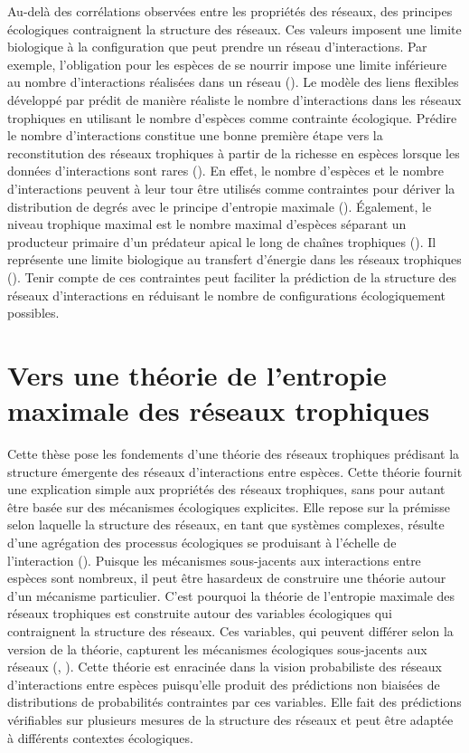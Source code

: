 Au-delà des corrélations observées entre les propriétés des réseaux, des
principes écologiques contraignent la structure des réseaux. Ces valeurs
imposent une limite biologique à la configuration que peut prendre un réseau
d'interactions. Par exemple, l'obligation pour les espèces de se nourrir impose
une limite inférieure au nombre d'interactions réalisées dans un réseau
(\cite{MacDonald2020Revisiting}). Le modèle des liens flexibles développé par
\cite{MacDonald2020Revisiting} prédit de manière réaliste le nombre
d'interactions dans les réseaux trophiques en utilisant le nombre d'espèces
comme contrainte écologique. Prédire le nombre d'interactions constitue une
bonne première étape vers la reconstitution des réseaux trophiques à partir de
la richesse en espèces lorsque les données d'interactions sont rares
(\cite{Strydom2021Roadmapa}). En effet, le nombre d'espèces et le nombre
d'interactions peuvent à leur tour être utilisés comme contraintes pour dériver
la distribution de degrés avec le principe d'entropie maximale
(\cite{Williams2011Biology}). Également, le niveau trophique maximal est le
nombre maximal d'espèces séparant un producteur primaire d'un prédateur apical
le long de chaînes trophiques (\cite{Cohen1978Food}). Il représente une limite
biologique au transfert d'énergie dans les réseaux trophiques
(\cite{Williams2004Limits}). Tenir compte de ces contraintes peut faciliter la
prédiction de la structure des réseaux d'interactions en réduisant le nombre de
configurations écologiquement possibles.  


\section{Vers une théorie de l'entropie maximale des réseaux trophiques}

Cette thèse pose les fondements d'une théorie des réseaux trophiques prédisant
la structure émergente des réseaux d'interactions entre espèces. Cette théorie
fournit une explication simple aux propriétés des réseaux trophiques, sans pour
autant être basée sur des mécanismes écologiques explicites. Elle repose sur la
prémisse selon laquelle la structure des réseaux, en tant que systèmes
complexes, résulte d'une agrégation des processus écologiques se produisant à
l'échelle de l'interaction (\cite{Frank2009Common}). Puisque les mécanismes
sous-jacents aux interactions entre espèces sont nombreux, il peut être
hasardeux de construire une théorie autour d'un mécanisme particulier. C'est
pourquoi la théorie de l'entropie maximale des réseaux trophiques est construite
autour des variables écologiques qui contraignent la structure des réseaux. Ces
variables, qui peuvent différer selon la version de la théorie, capturent les
mécanismes écologiques sous-jacents aux réseaux (\cite{White2012Characterizing},
\cite{McGill2010Mechanisms}). Cette théorie est enracinée dans la vision
probabiliste des réseaux d'interactions entre espèces puisqu'elle produit des
prédictions non biaisées de distributions de probabilités contraintes par ces
variables. Elle fait des prédictions vérifiables sur plusieurs mesures de la
structure des réseaux et peut être adaptée à différents contextes écologiques. 

